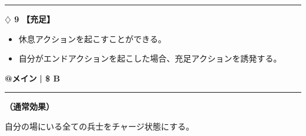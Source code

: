 \documentclass[twocolumn,a5paper,papersize,10pt]{jarticle}
\begin{document}
\vspace{-1zh}

 
 
 
 
 

\vspace{3mm} %
\hrule height 0.5mm depth 0mm width 66.5mm %
\vspace{1mm} %
{\Large\bf $\diamondsuit$ 9} {\normalsize\bf【充足】} %
\vspace{1mm} %


\vspace{-1zh}%
\begin{itemize}
\setlength{\leftskip}{-0.3cm}
\setlength{\parskip}{0pt} %

\item 休息アクションを起こすことができる。

\item 自分がエンドアクションを起こした場合、充足アクションを誘発する。
\vspace{-1zh}%
\end{itemize}

\begin{tcolorbox}[title={\small\bf【Action】休息}{\scriptsize （通常魔法）}]

{\scriptsize\bf @メイン }
  {\scriptsize\bf | \$ B }

\vspace{1mm} %
\hrule height 0.1mm depth 0mm width 62mm %
\vspace{1mm} %

{\bf（通常効果）}

自分の場にいる全ての兵士をチャージ状態にする。

\vspace{1mm} %
\end{tcolorbox}

\vspace{-1zh}

 
 
\end{document}
